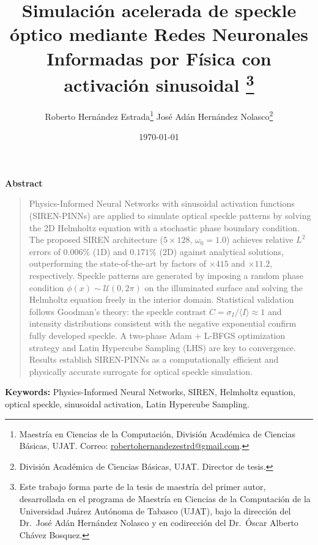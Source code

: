 \documentclass[12pt]{article}
\title{Simulación acelerada de speckle óptico mediante Redes
       Neuronales Informadas por Física con activación sinusoidal%
       \thanks{Este trabajo forma parte de la tesis de maestría del primer autor,
               desarrollada en el programa de Maestría en Ciencias de la Computación
               de la Universidad Juárez Autónoma de Tabasco (UJAT),
               bajo la dirección del Dr.\ José Adán Hernández Nolasco
               y en codirección del Dr.\ Óscar Alberto Chávez Bosquez.}}
\author{%
  Roberto Hernández Estrada\thanks{Maestría en Ciencias de la Computación,
    División Académica de Ciencias Básicas, UJAT.
    Correo: \href{mailto:robertohernandezestrd@gmail.com}{robertohernandezestrd@gmail.com}.} \quad
  José Adán Hernández Nolasco\thanks{División Académica de Ciencias Básicas, UJAT.
    Director de tesis.}
}
\date{\today}
\begin{document}

\maketitle
\thispagestyle{empty}

\begin{center}
  \textbf{Abstract}
\end{center}
\begin{quote}
\noindent\singlespacing
Physics-Informed Neural Networks with sinusoidal activation functions (SIREN-PINNs)
are applied to simulate optical speckle patterns by solving the 2D Helmholtz equation
with a stochastic phase boundary condition.
The proposed SIREN architecture ($5 \times 128$, $\omega_0 = 1.0$) achieves relative
$L^2$ errors of $0.006\%$ (1D) and $0.171\%$ (2D) against analytical solutions,
outperforming the state-of-the-art by factors of $\times 415$ and $\times 11.2$,
respectively.
Speckle patterns are generated by imposing a random phase condition
$\phi(x) \sim \mathcal{U}(0, 2\pi)$ on the illuminated surface and solving the
Helmholtz equation freely in the interior domain.
Statistical validation follows Goodman's theory: the speckle contrast
$C = \sigma_I / \langle I \rangle \approx 1$ and intensity distributions consistent
with the negative exponential confirm fully developed speckle.
A two-phase Adam + L-BFGS optimization strategy and Latin Hypercube Sampling (LHS)
are key to convergence.
Results establish SIREN-PINNs as a computationally efficient and physically accurate
surrogate for optical speckle simulation.
\end{quote}

\vspace{0.8em}
\noindent \textbf{Keywords:} Physics-Informed Neural Networks, SIREN,
Helmholtz equation, optical speckle, sinusoidal activation, Latin Hypercube Sampling.

\vspace{1.2em}
\end{document}

